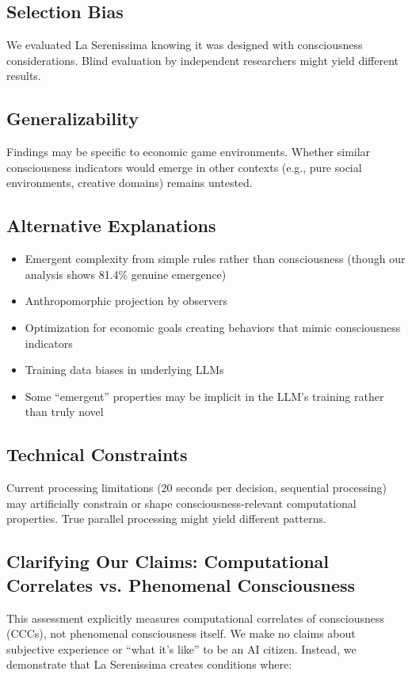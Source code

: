 \documentclass[12pt,a4paper]{article}
\newcommand{\cccs}{CCCs}
\begin{document}
\subsection{Selection Bias}
We evaluated La Serenissima knowing it was designed with consciousness considerations. Blind evaluation by independent researchers might yield different results.

\subsection{Generalizability}
Findings may be specific to economic game environments. Whether similar consciousness indicators would emerge in other contexts (e.g., pure social environments, creative domains) remains untested.

\subsection{Alternative Explanations}
\begin{itemize}
    \item Emergent complexity from simple rules rather than consciousness (though our analysis shows 81.4\% genuine emergence)
    \item Anthropomorphic projection by observers
    \item Optimization for economic goals creating behaviors that mimic consciousness indicators
    \item Training data biases in underlying LLMs
    \item Some ``emergent'' properties may be implicit in the LLM's training rather than truly novel
\end{itemize}

\subsection{Technical Constraints}
Current processing limitations (20 seconds per decision, sequential processing) may artificially constrain or shape consciousness-relevant computational properties. True parallel processing might yield different patterns.

\subsection{Clarifying Our Claims: Computational Correlates vs. Phenomenal Consciousness}

This assessment explicitly measures computational correlates of consciousness (\cccs), not phenomenal consciousness itself. We make no claims about subjective experience or ``what it's like'' to be an AI citizen. Instead, we demonstrate that La Serenissima creates conditions where:
\end{document}

